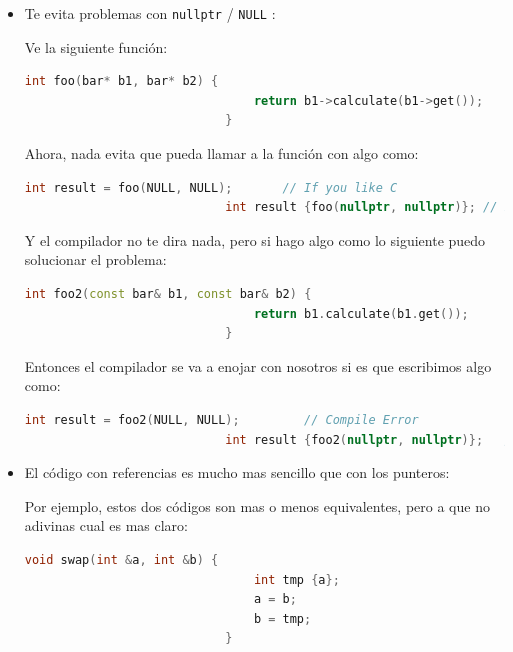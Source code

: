 \documentclass[12pt, fleqn]{report}                             %
\theoremstyle{break}                                            %
\newcommand{\textCode}[1]  { \texttt{#1} }                      %
\begin{document}
                \begin{itemize}
                    \item Te evita problemas con \textCode{nullptr} / \textCode{NULL}:

                        Ve la siguiente función:
                        \begin{lstlisting}[language=C++, gobble=28]
                            int foo(bar* b1, bar* b2) {
                                return b1->calculate(b1->get());
                            }
                        \end{lstlisting}

                        Ahora, nada evita que pueda llamar a la función con algo como:
                        \begin{lstlisting}[language=C++, gobble=28]
                            int result = foo(NULL, NULL);       // If you like C
                            int result {foo(nullptr, nullptr)}; // If you like C++
                        \end{lstlisting}

                        Y el compilador no te dira nada, pero si hago algo como lo siguiente puedo solucionar el
                        problema:
                        \begin{lstlisting}[language=C++, gobble=28]
                            int foo2(const bar& b1, const bar& b2) {
                                return b1.calculate(b1.get());
                            }
                        \end{lstlisting}

                        Entonces el compilador se va a enojar con nosotros si es que escribimos algo como:
                        \begin{lstlisting}[language=C++, gobble=28]
                            int result = foo2(NULL, NULL);         // Compile Error
                            int result {foo2(nullptr, nullptr)};   // Compile Error
                        \end{lstlisting}
                    
                    \item El código con referencias es mucho mas sencillo que con los punteros:

                        Por ejemplo, estos dos códigos son mas o menos equivalentes, pero a que no adivinas
                        cual es mas claro:
                        \begin{lstlisting}[language=C++, gobble=28]
                            void swap(int &a, int &b) {
                                int tmp {a};
                                a = b;
                                b = tmp;
                            }


\end{lstlisting}
\end{itemize}
\end{document}
